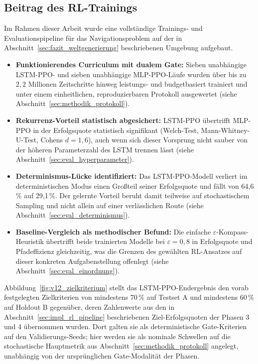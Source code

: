 \documentclass[
  a4paper,
  11pt,
  twoside,
  BCOR=8mm,           %
  headings=big,
  numbers=noenddot,
  listof=totoc,       %
  captions=tableheading,
]{scrreprt}
\begin{document}
\subsection{Beitrag des RL-Trainings}
\label{sec:fazit_rl}
Im Rahmen dieser Arbeit wurde eine vollständige Trainings- und Evaluationspipeline für das Navigationsproblem auf der in Abschnitt~\ref{sec:fazit_weltgenerierung} beschriebenen Umgebung aufgebaut.

\begin{itemize}
    \item \textbf{Funktionierendes Curriculum mit dualem Gate:} Sieben unabhängige LSTM-PPO- und sieben unabhängige MLP-PPO-Läufe wurden über bis zu $2{,}2$ Millionen Zeitschritte hinweg leistungs- und budgetbasiert trainiert und unter einem einheitlichen, reproduzierbaren Protokoll ausgewertet (siehe Abschnitt~\ref{sec:methodik_protokoll}).
    \item \textbf{Rekurrenz-Vorteil statistisch abgesichert:} LSTM-PPO übertrifft MLP-PPO in der Erfolgsquote statistisch signifikant (Welch-Test, Mann-Whitney-U-Test, Cohens $d = 1{,}6$), auch wenn sich dieser Vorsprung nicht sauber von der höheren Parameterzahl des LSTM trennen lässt (siehe Abschnitt~\ref{sec:eval_hyperparameter}).
    \item \textbf{Determinismus-Lücke identifiziert:} Das LSTM-PPO-Modell verliert im deterministischen Modus einen Großteil seiner Erfolgsquote und fällt von 64,6\,\% auf 29,1\,\%. Der gelernte Vorteil beruht damit teilweise auf stochastischem Sampling und nicht allein auf einer verlässlichen Route (siehe Abschnitt~\ref{sec:eval_determinismus}).
    \item \textbf{Baseline-Vergleich als methodischer Befund:} Die einfache $\varepsilon$-Kompass-Heuristik übertrifft beide trainierten Modelle bei $\varepsilon=0{,}8$ in Erfolgsquote und Pfadeffizienz gleichzeitig, was die Grenzen des gewählten RL-Ansatzes auf dieser konkreten Aufgabenstellung offenlegt (siehe Abschnitt~\ref{sec:eval_einordnung}).
\end{itemize}

Abbildung~\ref{fig:v12_zielkriterium} stellt das LSTM-PPO-Endergebnis den vorab festgelegten Zielkriterien von mindestens 70\,\% auf Testset A und mindestens 60\,\% auf Holdout B gegenüber, deren Zahlenwerte aus den in Abschnitt~\ref{sec:impl_rl_pipeline} beschriebenen Ziel-Erfolgsquoten der Phasen 3 und 4 übernommen wurden. Dort galten sie als deterministische Gate-Kriterien auf den Validierungs-Seeds; hier werden sie als nominale Schwellen auf die stochastische Hauptmetrik aus Abschnitt~\ref{sec:methodik_protokoll} angelegt, unabhängig von der ursprünglichen Gate-Modalität der Phasen.
\end{document}
